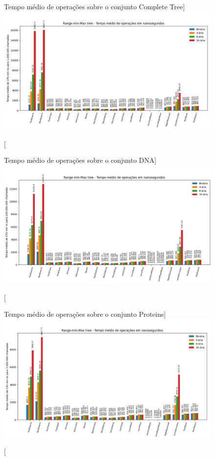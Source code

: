 \begin{landscape}

\begin{figure}[!ht]
    \centering
      \caption[Operações sobre o conjunto de dado ctree][Tempo médio de operações sobre o conjunto Complete Tree]{
          \includegraphics[scale=0.8]{images/ctree_i1000000.png}
        }
\end{figure}

\begin{figure}[!ht]
    \centering
      \caption[Operações sobre o conjunto de dado dna][Tempo médio de operações sobre o conjunto DNA]{
          \includegraphics[scale=0.8]{images/dna_i100000000.png}
        }
\end{figure}

\begin{figure}[!ht]
    \centering
      \caption[Operações sobre o conjunto de dado proteins][Tempo médio de operações sobre o conjunto Proteins]{
          \includegraphics[scale=0.8]{images/prot_i3000000.png}
        }
\end{figure}


\end{landscape}
